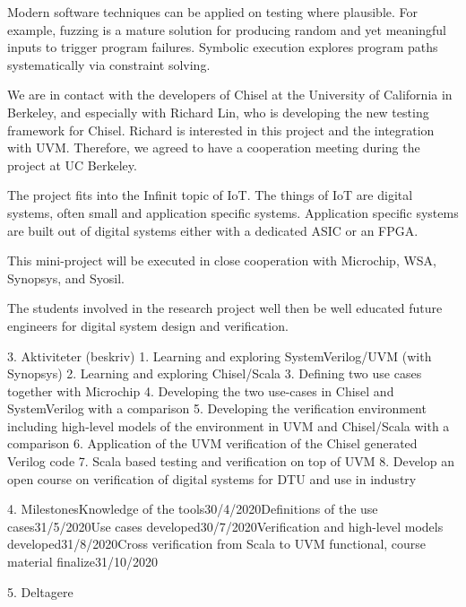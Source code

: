 \documentclass[fleqn,12pt]{article}
\begin{document}
Modern software techniques can be applied on testing where plausible. For example, fuzzing is a mature solution for producing random and yet meaningful inputs to trigger program failures. Symbolic execution explores program paths systematically via constraint solving.



We are in contact with the developers of Chisel at the University of California in Berkeley, and especially with Richard Lin, who is developing the new testing framework for Chisel. Richard is interested in this project and the integration with UVM. Therefore, we agreed to have a cooperation meeting during the project at UC Berkeley.



The project fits into the Infinit topic of IoT. The things of IoT are digital systems, often small and application specific systems. Application specific systems are built out of digital systems either with a dedicated ASIC or an FPGA.



This mini-project will be executed in close cooperation with Microchip, WSA, Synopsys, and Syosil. 



The students involved in the research project well then be well educated future engineers for digital system design and verification.



3. Aktiviteter (beskriv) 1. Learning and exploring SystemVerilog/UVM (with Synopsys)
2. Learning and exploring Chisel/Scala
3. Defining two use cases together with Microchip
4. Developing the two use-cases in Chisel and SystemVerilog with a comparison
5. Developing the verification environment including high-level models of the environment in UVM and Chisel/Scala with a comparison
6. Application of the UVM verification of the Chisel generated Verilog code
7. Scala based testing and verification on top of UVM
8. Develop an open course on verification of digital systems for DTU and use in industry




4. MilestonesKnowledge of the tools30/4/2020Definitions of the use cases31/5/2020Use cases developed30/7/2020Verification and high-level models developed31/8/2020Cross verification from Scala to UVM functional, course material finalize31/10/2020

5. Deltagere
\end{document}

